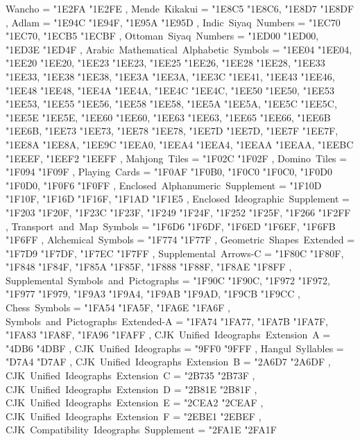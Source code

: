 {    Wancho                                         = { {"1E2FA} {"1E2FE} },
    Mende~Kikakui                                  = { {"1E8C5} {"1E8C6}, {"1E8D7} {"1E8DF} },
    Adlam                                          = { {"1E94C} {"1E94F}, {"1E95A} {"1E95D} },
    Indic~Siyaq~Numbers                            = { {"1EC70} {"1EC70}, {"1ECB5} {"1ECBF} },
    Ottoman~Siyaq~Numbers                          = { {"1ED00} {"1ED00}, {"1ED3E} {"1ED4F} },
    Arabic~Mathematical~Alphabetic~Symbols         = { {"1EE04} {"1EE04}, {"1EE20} {"1EE20}, {"1EE23} {"1EE23}, {"1EE25} {"1EE26}, {"1EE28} {"1EE28}, {"1EE33} {"1EE33}, {"1EE38} {"1EE38}, {"1EE3A} {"1EE3A}, {"1EE3C} {"1EE41}, {"1EE43} {"1EE46}, {"1EE48} {"1EE48}, {"1EE4A} {"1EE4A}, {"1EE4C} {"1EE4C}, {"1EE50} {"1EE50}, {"1EE53} {"1EE53}, {"1EE55} {"1EE56}, {"1EE58} {"1EE58}, {"1EE5A} {"1EE5A}, {"1EE5C} {"1EE5C}, {"1EE5E} {"1EE5E}, {"1EE60} {"1EE60}, {"1EE63} {"1EE63}, {"1EE65} {"1EE66}, {"1EE6B} {"1EE6B}, {"1EE73} {"1EE73}, {"1EE78} {"1EE78}, {"1EE7D} {"1EE7D}, {"1EE7F} {"1EE7F}, {"1EE8A} {"1EE8A}, {"1EE9C} {"1EEA0}, {"1EEA4} {"1EEA4}, {"1EEAA} {"1EEAA}, {"1EEBC} {"1EEEF}, {"1EEF2} {"1EEFF} },
    Mahjong~Tiles                                  = { {"1F02C} {"1F02F} },
    Domino~Tiles                                   = { {"1F094} {"1F09F} },
    Playing~Cards                                  = { {"1F0AF} {"1F0B0}, {"1F0C0} {"1F0C0}, {"1F0D0} {"1F0D0}, {"1F0F6} {"1F0FF} },
    Enclosed~Alphanumeric~Supplement               = { {"1F10D} {"1F10F}, {"1F16D} {"1F16F}, {"1F1AD} {"1F1E5} },
    Enclosed~Ideographic~Supplement                = { {"1F203} {"1F20F}, {"1F23C} {"1F23F}, {"1F249} {"1F24F}, {"1F252} {"1F25F}, {"1F266} {"1F2FF} },
    Transport~and~Map~Symbols                      = { {"1F6D6} {"1F6DF}, {"1F6ED} {"1F6EF}, {"1F6FB} {"1F6FF} },
    Alchemical~Symbols                             = { {"1F774} {"1F77F} },
    Geometric~Shapes~Extended                      = { {"1F7D9} {"1F7DF}, {"1F7EC} {"1F7FF} },
    Supplemental~Arrows-C                          = { {"1F80C} {"1F80F}, {"1F848} {"1F84F}, {"1F85A} {"1F85F}, {"1F888} {"1F88F}, {"1F8AE} {"1F8FF} },
    Supplemental~Symbols~and~Pictographs           = { {"1F90C} {"1F90C}, {"1F972} {"1F972}, {"1F977} {"1F979}, {"1F9A3} {"1F9A4}, {"1F9AB} {"1F9AD}, {"1F9CB} {"1F9CC} },
    Chess~Symbols                                  = { {"1FA54} {"1FA5F}, {"1FA6E} {"1FA6F} },
    Symbols~and~Pictographs~Extended-A             = { {"1FA74} {"1FA77}, {"1FA7B} {"1FA7F}, {"1FA83} {"1FA8F}, {"1FA96} {"1FAFF} },
    CJK~Unified~Ideographs~Extension~A             = { {"4DB6} {"4DBF} },
    CJK~Unified~Ideographs                         = { {"9FF0} {"9FFF} },
    Hangul~Syllables                               = { {"D7A4} {"D7AF} },
    CJK~Unified~Ideographs~Extension~B             = { {"2A6D7} {"2A6DF} },
    CJK~Unified~Ideographs~Extension~C             = { {"2B735} {"2B73F} },
    CJK~Unified~Ideographs~Extension~D             = { {"2B81E} {"2B81F} },
    CJK~Unified~Ideographs~Extension~E             = { {"2CEA2} {"2CEAF} },
    CJK~Unified~Ideographs~Extension~F             = { {"2EBE1} {"2EBEF} },
    CJK~Compatibility~Ideographs~Supplement        = { {"2FA1E} {"2FA1F} }
  }
